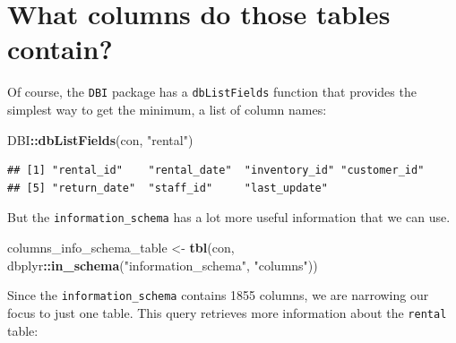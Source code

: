 \documentclass[]{book}
\newenvironment{Shaded}{\begin{snugshade}}{\end{snugshade}}
\newcommand{\KeywordTok}[1]{\textcolor[rgb]{0.13,0.29,0.53}{\textbf{#1}}}
\newcommand{\NormalTok}[1]{#1}
\newcommand{\OperatorTok}[1]{\textcolor[rgb]{0.81,0.36,0.00}{\textbf{#1}}}
\newcommand{\StringTok}[1]{\textcolor[rgb]{0.31,0.60,0.02}{#1}}
\theoremstyle{definition}
\theoremstyle{definition}
\theoremstyle{definition}
\theoremstyle{remark}
\begin{document}
\hypertarget{what-columns-do-those-tables-contain}{%
\section{What columns do those tables
contain?}\label{what-columns-do-those-tables-contain}}

Of course, the \texttt{DBI} package has a \texttt{dbListFields} function
that provides the simplest way to get the minimum, a list of column
names:

\begin{Shaded}
\begin{Highlighting}[]
\NormalTok{DBI}\OperatorTok{::}\KeywordTok{dbListFields}\NormalTok{(con, }\StringTok{"rental"}\NormalTok{)}
\end{Highlighting}
\end{Shaded}

\begin{verbatim}
## [1] "rental_id"    "rental_date"  "inventory_id" "customer_id" 
## [5] "return_date"  "staff_id"     "last_update"
\end{verbatim}

But the \texttt{information\_schema} has a lot more useful information
that we can use.

\begin{Shaded}
\begin{Highlighting}[]
\NormalTok{columns_info_schema_table <-}\StringTok{ }\KeywordTok{tbl}\NormalTok{(con, dbplyr}\OperatorTok{::}\KeywordTok{in_schema}\NormalTok{(}\StringTok{"information_schema"}\NormalTok{, }\StringTok{"columns"}\NormalTok{))}
\end{Highlighting}
\end{Shaded}

Since the \texttt{information\_schema} contains 1855 columns, we are
narrowing our focus to just one table. This query retrieves more
information about the \texttt{rental} table:
\end{document}
